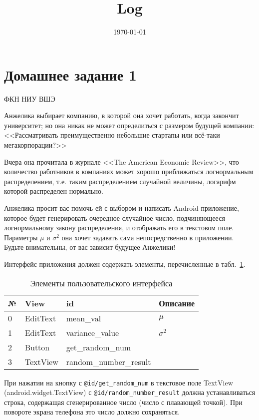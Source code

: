 \documentclass{article}
\title{Log}
\author{}
\date{\today}
\begin{document}
\section*{Домашнее задание 1}

ФКН НИУ ВШЭ \vspace{1.5em}

Анжелика выбирает компанию, в которой она хочет работать, когда закончит университет; но она никак не может определиться с размером будущей компании: <<Рассматривать преимущественно небольшие стартапы или всё-таки мегакорпорации?>>

Вчера она прочитала в журнале <<The American Economic Review>>, что количество работников в компаниях может хорошо приближаться логнормальным распределением, т.е. таким распределением случайной величины, логарифм которой распределен нормально.

Анжелика просит вас помочь ей с выбором и написать Android приложение, которое будет генерировать очередное случайное число, подчиняющееся логнормальному закону распределения, и отображать его в текстовом поле. Параметры $\mu$ и $\sigma ^2$ она хочет задавать сама непосредственно в приложении.
Будьте внимательны, от вас зависит будущее Анжелики!

Интерфейс приложения должен содержать элементы, перечисленные в табл.~\ref{table:layout:ids}.


\begin{table}[h]
\begin{center}
    \begin{tabularx}{0.78\textwidth}{p{3ex} p{13ex} X p{10ex}}
\midrule\toprule
№ & View            & id                        & Описание \\ \midrule
0 & EditText        & mean\_val                 & $\mu$ \\
1 & EditText        & variance\_value           & $\sigma ^2$  \\
2 & Button          & get\_random\_num          & $	 $   \\
3 & TextView        & random\_number\_result    & $	 $    \\

\bottomrule\midrule
    \end{tabularx}
    \caption{Элементы пользовательского интерфейса}
    \label{table:layout:ids}
\end{center}
\end{table}


При нажатии на кнопку с \texttt{@id/get\_random\_num} в текстовое поле TextView  (android.widget.TextView) с \texttt{@id/random\_number\_result} должна устанавливаться строка, 
содержащая сгенерированное число (число с плавающей точкой).
При повороте экрана телефона это число должно сохраняться.
\end{document}
